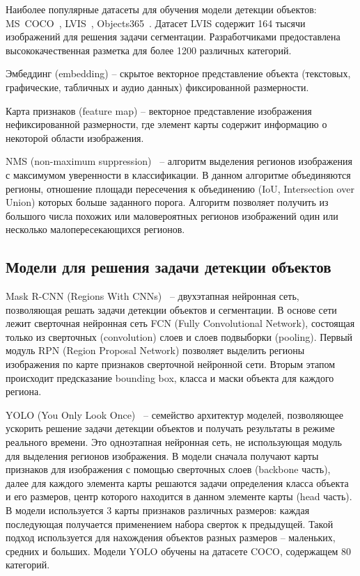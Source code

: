 \documentclass[a4paper,14pt]{article}
\begin{document}
    Наиболее популярные датасеты для обучения модели детекции объектов: MS~COCO~\cite{COCO}, LVIS~\cite{LVIS}, Objects365~\cite{Objects365}.
    Датасет LVIS содержит 164 тысячи изображений для решения задачи сегментации. Разработчиками предоставлена высококачественная разметка для более 1200 различных категорий.
    
    Эмбеддинг (embedding) -- скрытое векторное представление объекта (текстовых, графические, табличных и аудио данных) фиксированной размерности.

    Карта признаков (feature map) -- векторное представление изображения нефиксированной размерности, где элемент карты содержит информацию о некоторой области изображения.

    NMS (non-maximum suppression)~\cite{neubeck2006efficient} -- алгоритм выделения регионов изображения с максимумом уверенности в классификации.
    В данном алгоритме объединяются регионы, отношение площади пересечения к объединению (IoU, Intersection over Union) которых больше заданного порога.
    Алгоритм позволяет получить из большого числа похожих или маловероятных регионов изображений один или несколько малопересекающихся регионов.

	\subsection{Модели для решения задачи детекции объектов}

    Mask R-CNN (Regions With CNNs)~\cite{MaskRCNN} -- двухэтапная нейронная сеть, позволяющая решать задачи детекции объектов и сегментации. В основе сети лежит сверточная нейронная сеть FCN (Fully Convolutional Network), состоящая только из сверточных (convolution) слоев и слоев подвыборки (pooling). Первый модуль RPN (Region Proposal Network) позволяет выделить регионы изображения по карте признаков сверточной нейронной сети. Вторым этапом происходит предсказание bounding box, класса и маски объекта для каждого региона.

    YOLO (You Only Look Once)~\cite{redmon2016you} -- семейство архитектур моделей, позволяющее ускорить решение задачи детекции объектов и получать результаты в режиме реального времени.
    Это одноэтапная нейронная сеть, не использующая модуль для выделения регионов изображения.
    В модели сначала получают карты признаков для изображения с помощью сверточных слоев (backbone часть), далее для каждого элемента карты решаются задачи определения класса объекта и его размеров, центр которого находится в данном элементе карты (head часть).
    В модели используется 3 карты признаков различных размеров: каждая последующая получается применением набора сверток к предыдущей.
    Такой подход используется для нахождения объектов разных размеров -- маленьких, средних и больших.
    Модели YOLO обучены на датасете COCO, содержащем 80 категорий.
\end{document}
